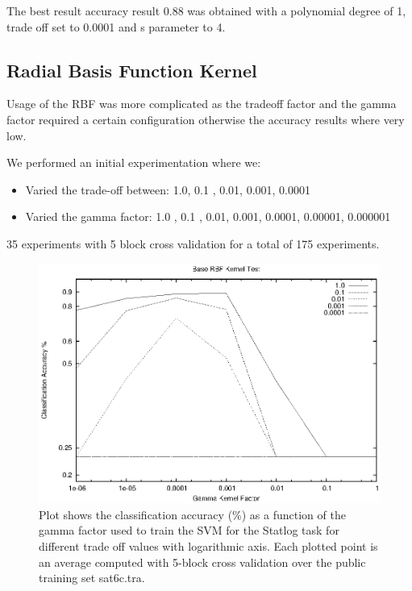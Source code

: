 \documentclass[a4paper,10pt,titlepage]{article}
\begin{document}
\par The best result accuracy result 0.88 was obtained with a polynomial degree of 1, trade off set to 0.0001 and s parameter to 4.

\subsection{Radial Basis Function Kernel}

\par Usage of the RBF was more complicated as the tradeoff factor and the gamma factor required a certain configuration otherwise the accuracy results where very low.

\par We performed an initial experimentation where we:
\begin{itemize}
	\item Varied the trade-off between: 1.0, 0.1 , 0.01, 0.001, 0.0001
	\item Varied the gamma factor: 1.0 , 0.1 , 0.01, 0.001, 0.0001, 0.00001, 0.000001
\end{itemize}
\par 35 experiments with 5 block cross validation for a total of 175 experiments.

\begin{figure}[H]
	\centerline{%
	\includegraphics[]{base_rbf.eps}
	}
	\caption[Statlog Task: Base experiment classification accuracy for RBF kernel]{Plot shows the classification accuracy (\%)  as a function of the gamma factor used to train the SVM for the Statlog task for different trade off values with logarithmic axis. Each plotted point is an average computed with 5-block cross validation over the public training set sat6c.tra.}
\end{figure}
\end{document}
